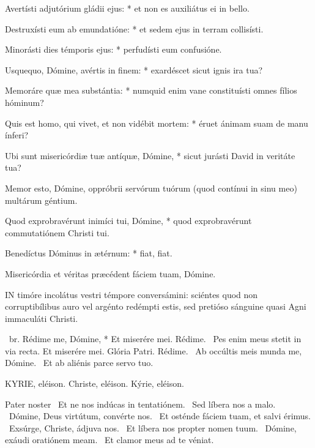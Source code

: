 Avertísti adjutórium gládii ejus: * et non es auxiliátus ei in bello.

Destruxísti eum ab emundatióne: * et sedem ejus in terram collisísti.

Minorásti dies témporis ejus: * perfudísti eum confusióne.

Usquequo, Dómine, avértis in finem: * exardéscet sicut ignis ira tua?

Memoráre quæ mea substántia: * numquid enim vane constituísti omnes fílios hóminum?

Quis est homo, qui vivet, et non vidébit mortem: * éruet ánimam suam de manu ínferi?

Ubi sunt misericórdiæ tuæ antíquæ, Dómine, * sicut jurásti David in veritáte tua?

Memor esto, Dómine, oppróbrii servórum tuórum (quod contínui in sinu meo) multárum géntium.

Quod exprobravérunt inimíci tui, Dómine, * quod exprobravérunt commutatiónem Christi tui.

Benedíctus Dóminus in ætérnum: * fiat, fiat.

 Misericórdia et véritas præcédent fáciem tuam, Dómine.



\lettrine[lines=2]{I}{N} timóre incolátus vestri témpore conversámini: sciéntes quod non corruptibílibus auro vel argénto redémpti estis, sed pretióso sánguine quasi Agni immaculáti Christi.

\R\ br. Rédime me, Dómine, * Et miserére mei. Rédime. \V\ Pes enim meus stetit in via recta. Et miserére mei. Glória Patri. Rédime. \V\ Ab occúltis meis munda me, Dómine. \R\ Et ab aliénis parce servo tuo.



KYRIE, eléison. Christe, eléison. Kýrie, eléison.

Pater noster  \V\ Et ne nos indúcas in tentatiónem. \R\ Sed líbera nos a malo. \V\ Dómine, Deus virtútum, convérte nos. \R\ Et osténde fáciem tuam, et salvi érimus. \V\ Exsúrge, Christe, ádjuva nos. \R\ Et líbera nos propter nomen tuum. \V\ Dómine, exáudi oratiónem meam. \R\ Et clamor meus ad te véniat.


